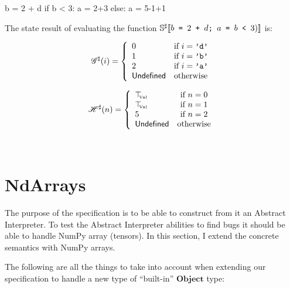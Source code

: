 \begin{pythoncode}
b = 2 + d
if b < 3:
  a = 2+3
else:
  a = 5-1+1
\end{pythoncode}

The state result of evaluating the function
\(\mathbb{S^\sharp}\!\left\llbracket b \texttt{ = } 2 \texttt{ + } d \texttt{; } a \texttt{ = } b \texttt{ < } 3) \right\rrbracket\)
is:\\[.4em]

\begin{minipage}{0.45\textwidth}
  \[\mathscr{G}^\sharp(i) = \left\{
    \begin{array}{ll}
      0 & \text{if } i = \texttt{'d'} \\
      1 & \text{if } i = \texttt{'b'} \\
      2 & \text{if } i = \texttt{'a'} \\
      \mathsf{Undefined}      & \text{otherwise} \\
    \end{array}
  \right.\]
\end{minipage}\hfill%
\begin{minipage}{0.45\textwidth}
  \[\mathscr{H}^\sharp(n) = \left\{
    \begin{array}{lcl}
      \top_{\hspace{-1mm}{\text{\tiny{Val}}}} & \text{if } n = 0 \\
      \top_{\hspace{-1mm}{\text{\tiny{Val}}}} & \text{if } n = 1 \\
      5 & \text{if } n = 2 \\
      \mathsf{Undefined} & \text{otherwise} \\
    \end{array}
  \right.\]
\end{minipage}\hfill\\[0.4em]


\section{NdArrays}

The purpose of the specification is to be able to construct from it an Abstract
Interpreter. To test the Abstract Interpreter abilities to find bugs it should be able to
handle NumPy array (tensors). In this section, I extend the concrete semantics with NumPy
arrays.

The following are all the things to take into account when extending our specification to
handle a new type of \enquote{built-in} \(\mathbf{Object}\) type:

